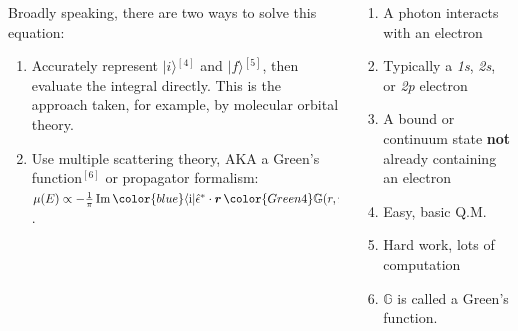 \documentclass[10pt, xcolor=x11names, compress]{beamer}
\renewcommand{\Im}{\operatorname{Im}}
\newcommand{\GMS}{\mathbb{G}}
\begin{document}
\begin{frame}
\begin{columns}
\begin{column}{0.75\linewidth}
      Broadly speaking, there are two ways to solve this equation:
      \begin{enumerate}
      \item Accurately represent {\color{blue}$|i\rangle$}$^\mathrm{[4]}$  and
        {\color{red}$|f\rangle$}$^\mathrm{[5]}$, then evaluate
        the integral directly. This is the approach taken, for example, by
        molecular orbital theory.
      \item Use multiple scattering theory, AKA a Green's
        function$^\mathrm{[6]}$ or propagator formalism:\\
        {\footnotesize
        $\mu(E) \propto
        -\frac{1}{\pi} \Im {\color{blue}\langle \mathrm{i}
          |} \hat{\epsilon}^\ast \cdot \boldsymbol{r} \,
        {\color{Green4}\mathbb{G}(r,r';E)} \hat{\epsilon} \cdot \boldsymbol{r}' {\color{blue}|
          \mathrm{i} \rangle}
        \Theta(E-E_F)$.}
      \end{enumerate}      
    \end{column}
    \begin{column}{0.25\linewidth}
      \begin{enumerate}
        \tiny
      \item A photon interacts with an electron
      \item Typically a \textit{1s}, \textit{2s}, or \textit{2p} electron
      \item A bound or continuum state \textbf{not} already containing
        an electron
      \item Easy, basic Q.M.
      \item Hard work, lots of computation
      \item {\color{Green4}$\GMS$} is called a Green's function.
      \end{enumerate}
    \end{column}
  \end{columns}
\end{frame}
\end{document}
